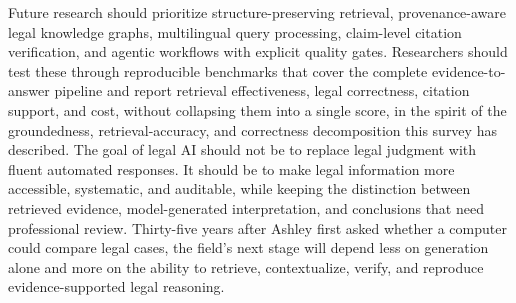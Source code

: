 Future research should prioritize structure-preserving retrieval, provenance-aware legal knowledge
graphs, multilingual query processing, claim-level citation verification, and agentic workflows with
explicit quality gates. Researchers should test these through reproducible benchmarks that cover the
complete evidence-to-answer pipeline and report retrieval effectiveness, legal correctness, citation
support, and cost, without collapsing them into a single score, in the spirit of the groundedness,
retrieval-accuracy, and correctness decomposition this survey has described. The goal of legal AI
should not be to replace legal judgment with fluent automated responses. It should be to make legal
information more accessible, systematic, and auditable, while keeping the distinction between
retrieved evidence, model-generated interpretation, and conclusions that need professional review.
Thirty-five years after Ashley first asked whether a computer could compare legal cases, the field's
next stage will depend less on generation alone and more on the ability to retrieve, contextualize,
verify, and reproduce evidence-supported legal reasoning.
